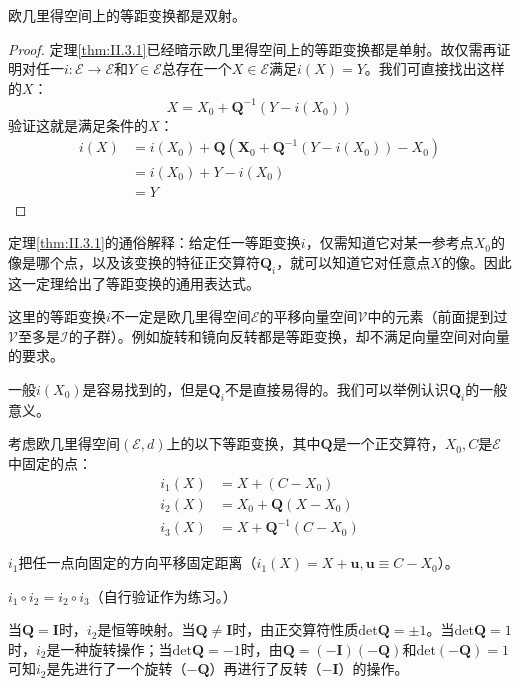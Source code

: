 \documentclass[main.tex]{subfiles}
\begin{document}
\begin{corollary}
    欧几里得空间上的等距变换都是双射。
\end{corollary}
\begin{proof}
    定理\ref{thm:II.3.1}已经暗示欧几里得空间上的等距变换都是单射。故仅需再证明对任一$i:
        \mathcal{E}\rightarrow\mathcal{E}$和$Y\in\mathcal{E}$总存在一个$X\in\mathcal{E}$满足$i\left(X\right)=Y$。我们可直接找出这样的$X$：
    \[
        X=X_0+\mathbf{Q}^{-1}\left(Y-i\left(X_0\right)\right)
    \]
    验证这就是满足条件的$X$：
    \begin{align*}
        i\left(X\right) & =i\left(X_0\right)+\mathbf{Q}\left(\mathbf{X}_0+\mathbf{Q}^{-1}\left(Y-i\left(X_0\right)\right)-X_0\right) \\
                        & =i\left(X_0\right)+Y-i\left(X_0\right)                                                                     \\
                        & =Y
    \end{align*}
\end{proof}

定理\ref{thm:II.3.1}的通俗解释：给定任一等距变换$i$，仅需知道它对某一参考点$X_0$的像是哪个点，以及该变换的特征正交算符$\mathbf{Q}_i$，就可以知道它对任意点$X$的像。因此这一定理给出了等距变换的通用表达式。

这里的等距变换$i$不一定是欧几里得空间$\mathcal{E}$的平移向量空间$\mathcal{V}$中的元素（前面提到过$\mathcal{V}$至多是$\mathcal{I}$的子群）。例如旋转和镜向反转都是等距变换，却不满足向量空间对向量的要求。

一般$i\left(X_0\right)$是容易找到的，但是$\mathbf{Q}_i$不是直接易得的。我们可以举例认识$\mathbf{Q}_i$的一般意义。

\begin{example}
    考虑欧几里得空间$\left(\mathcal{E},d\right)$上的以下等距变换，其中$\mathbf{Q}$是一个正交算符，$X_0,C$是$\mathcal{E}$中固定的点：
    \begin{align*}
        i_1\left(X\right) & =X+\left(C-X_0\right)                \\
        i_2\left(X\right) & =X_0+\mathbf{Q}\left(X-X_0\right)    \\
        i_3\left(X\right) & =X+\mathbf{Q}^{-1}\left(C-X_0\right)
    \end{align*}

    $i_1$把任一点向固定的方向平移固定距离（$i_1\left(X\right)=X+\mathbf{u},\mathbf{u}\equiv C-X_0$）。

    $i_1\circ i_2=i_2\circ i_3$（自行验证作为练习。）

    当$\mathbf{Q}=\mathbf{I}$时，$i_2$是恒等映射。当$\mathbf{Q}\neq\mathbf{I}$时，由正交算符性质$\mathrm{det}\mathbf{Q}=\pm 1$。当$\mathrm{det}\mathbf{Q}=1$时，$i_2$是一种旋转操作；当$\mathrm{det}\mathbf{Q}=-1$时，由$\mathbf{Q}=\left(-\mathbf{I}\right)\left(-\mathbf{Q}\right)$和$\mathrm{det}\left(-\mathbf{Q}\right)=1$可知$i_2$是先进行了一个旋转（$-\mathbf{Q}$）再进行了反转（$-\mathbf{I}$）的操作。
\end{example}
\end{document}
